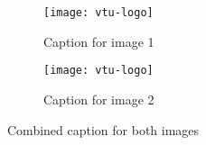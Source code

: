 \documentclass{article}
\begin{document}
	
	\begin{figure}
		\centering
		\begin{subfigure}{0.46\linewidth} %
			\texttt{[image: vtu-logo]} %
			\caption{Caption for image 1} %
			\label{fig:subfig1} %
		\end{subfigure}
		\hfill %
		\begin{subfigure}{0.44\linewidth} %
			\texttt{[image: vtu-logo]} %
			\caption{Caption for image 2} %
			\label{fig:subfig2} %
		\end{subfigure}
		\caption{Combined caption for both images} %
		\label{fig:subfigures} %
	\end{figure}
	
\end{document}
